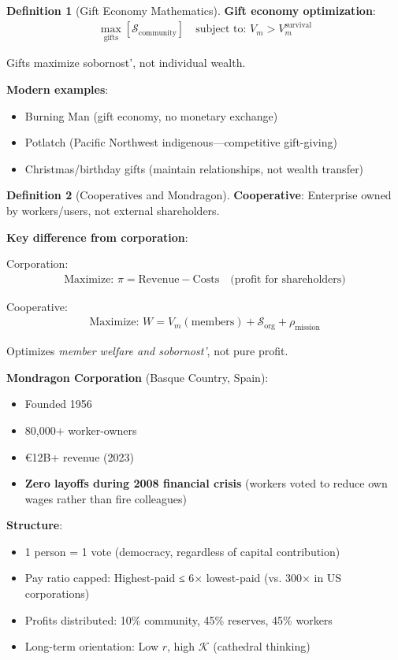\documentclass[11pt,a4paper]{article}
\theoremstyle{definition}
\newtheorem{definition}{Definition}[section]
\theoremstyle{remark}
\begin{document}
\begin{enumerate}
\begin{definition}[Gift Economy Mathematics]
\textbf{Gift economy optimization}:
\begin{align}
\max_{\text{gifts}} \left[ \mathcal{S}_{\text{community}} \right] \quad \text{subject to: } V_m > V_m^{\text{survival}}
\end{align}

Gifts maximize sobornost', not individual wealth.

\textbf{Modern examples}:
\begin{itemize}
    \item Burning Man (gift economy, no monetary exchange)
    \item Potlatch (Pacific Northwest indigenous—competitive gift-giving)
    \item Christmas/birthday gifts (maintain relationships, not wealth transfer)
\end{itemize}
\end{definition}

\begin{definition}[Cooperatives and Mondragon]
\textbf{Cooperative}: Enterprise owned by workers/users, not external shareholders.

\textbf{Key difference from corporation}:

Corporation:
\begin{align}
\text{Maximize: } \pi = \text{Revenue} - \text{Costs} \quad \text{(profit for shareholders)}
\end{align}

Cooperative:
\begin{align}
\text{Maximize: } W = V_m(\text{members}) + \mathcal{S}_{\text{org}} + \rho_{\text{mission}}
\end{align}

Optimizes \textit{member welfare and sobornost'}, not pure profit.

\textbf{Mondragon Corporation} (Basque Country, Spain):
\begin{itemize}
    \item Founded 1956
    \item 80,000+ worker-owners
    \item €12B+ revenue (2023)
    \item \textbf{Zero layoffs during 2008 financial crisis} (workers voted to reduce own wages rather than fire colleagues)
\end{itemize}

\textbf{Structure}:
\begin{itemize}
    \item 1 person = 1 vote (democracy, regardless of capital contribution)
    \item Pay ratio capped: Highest-paid ≤ 6× lowest-paid (vs. 300× in US corporations)
    \item Profits distributed: 10\% community, 45\% reserves, 45\% workers
    \item Long-term orientation: Low \(r\), high \(\mathcal{K}\) (cathedral thinking)
\end{itemize}


\end{definition}
\end{enumerate}
\end{document}
